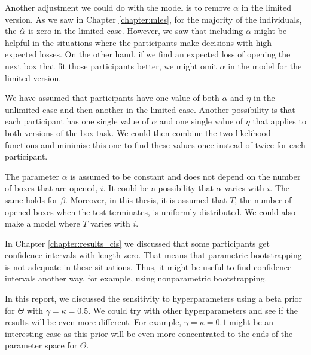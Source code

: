 
Another adjustment we could do with the model is to remove $\alpha$ in the limited version. As we saw in Chapter \ref{chapter:mles},
for the majority of the individuals, the $\hat{\alpha}$ is zero in the limited case. However, we saw that including $\alpha$ might be helpful in the situations where the participants make decisions with high expected losses. On the other hand, if we find an expected loss of opening the next box that fit those participants better, we might omit $\alpha$ in the model for the limited version.

We have assumed that participants have one value of both $\alpha$ and $\eta$ in the unlimited case and then another in the limited case. Another possibility is that each participant has one single value of $\alpha$ and one single value of $\eta$ that applies to both versions of the box task. We could then combine the two likelihood functions and minimise this one to find these values once instead of twice for each participant. 

The parameter $\alpha$ is assumed to be constant and does not depend on the number of boxes that are opened, $i$. It could be a possibility that $\alpha$ varies with $i$. The same holds for $\beta$. Moreover, in this thesis, it is assumed that $T$, the number of opened boxes when the test terminates, is uniformly distributed. We could also make a model where $T$ varies with $i$. 

In Chapter \ref{chapter:results_cis} we discussed that some participants get confidence intervals with length zero. That means that parametric bootstrapping is not adequate in these situations. Thus, it might be useful to find confidence intervals another way, for example, using nonparametric bootstrapping. 

In this report, we discussed the sensitivity to hyperparameters using a beta prior for $\Theta$ with $\gamma=\kappa=0.5$. We could try with other hyperparameters and see if the results will be even more different. For example, $\gamma=\kappa=0.1$ might be an interesting case as this prior will be even more concentrated to the ends of the parameter space for $\Theta$. 


